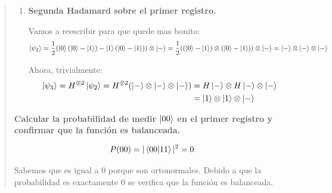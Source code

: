 \begin{quote}
\begin{enumerate}
        \item \textbf{Segunda Hadamard sobre el primer registro.}

            Vamos a reescribir para que quede mas bonito:
            $$
            \ket{\psi_2} = \frac{1}{2} (\ket{0} (\ket{0} -\ket{1})
            -\ket{1} (\ket{0} - \ket{1})) \otimes \ket{-} = \frac{1}{2} ((\ket{0}
            -\ket{1}) \otimes (\ket{0} - \ket{1})) \otimes \ket{-} =
            \ket{-}\otimes \ket{-}\otimes \ket{-}
            $$

            Ahora, trivialmente:
            \begin{align*}
                \ket{\psi_3} = H^{\otimes 2} \ket{\psi_2} = H^{\otimes
                2}(\ket{-}\otimes \ket{-}\otimes \ket{-}) &= H \ket{-}\otimes
                H \ket{-} \otimes \ket{-} \\
                                                          &= \ket{1} \otimes \ket{1} \otimes \ket{-} \\
            \end{align*}
    \end{enumerate}

    \textbf{Calcular la probabilidad de medir $\ket{00}$ en el primer registro y confirmar que la
    función es balanceada.}

    $$
    P(00) = |\bra{00}\ket{11}| ^2 = 0
    $$

    Sabemos que es igual a 0 porque son ortonormales. Debido a que la probabilidad es exactamente 0
    se verifica que la función es balanceada.
\end{quote}

\vspace{.5cm}
